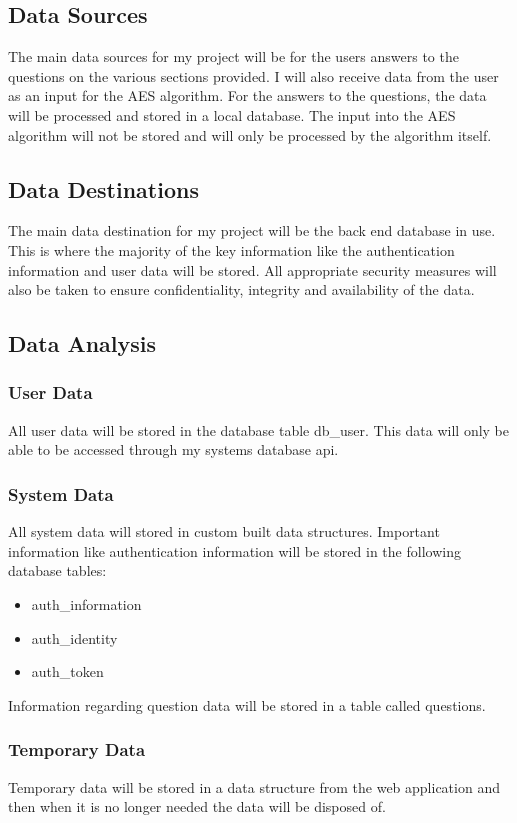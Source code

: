 \subsection{Data Sources}

The main data sources for my project will be for the users answers to the questions on the various sections provided. I will also receive data from the user as an input for the AES algorithm. For the answers to the questions, the data will be processed and stored in a local database. The input into the AES algorithm will not be stored and will only be processed by the algorithm itself. 

\subsection{Data Destinations}

The main data destination for my project will be the back end database in use. This is where the majority of the key information like the authentication information and user data will be stored. All appropriate security measures will also be taken to ensure confidentiality, integrity and availability of the data.

\subsection{Data Analysis}
\subsubsection{User Data}

All user data will be stored in the database table db\_user. This data will only be able to be accessed through my systems database api. 

\subsubsection{System Data}

All system data will stored in custom built data structures. Important information like authentication information will be stored in the following database tables:

\begin{itemize}
\item{auth\_information}
\item{auth\_identity}
\item{auth\_token}
\end{itemize}

Information regarding question data will be stored in a table called questions.

\subsubsection{Temporary Data}

Temporary data will be stored in a data structure from the web application and then when it is no longer needed the data will be disposed of.


